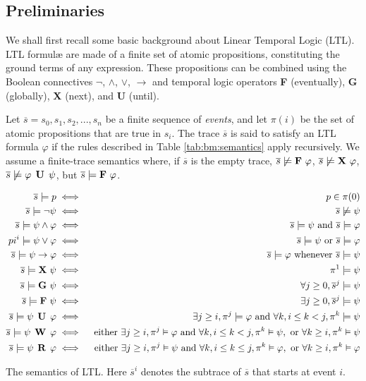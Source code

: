 \subsection{Preliminaries}

We shall first recall some basic background about Linear Temporal Logic (LTL). LTL formul\ae{} are made of a finite set of atomic propositions, constituting the ground terms of any expression. These propositions can be combined using the Boolean connectives $\neg$, $\wedge$, $\vee$, $\rightarrow$ and temporal logic operators \textbf{F} (eventually), \textbf{G} (globally), \textbf{X} (next), and \textbf{U} (until).

Let $\overline{s} = s_0, s_1, s_2, ..., s_n$ be a finite sequence of \emph{events}, and let $\pi(i)$ be the set of atomic propositions that are true in $s_i$. The trace $\overline{s}$ is said to satisfy an LTL formula $\varphi$ if the rules described in Table \ref{tab:bm:semantics} apply recursively. We assume a finite-trace semantics where, if $\overline{s}$ is the empty trace,  $\overline{s} \not\models \mathop{\mbox{\textbf{F}}}\, \varphi$, $\overline{s} \not\models \mathop{\mbox{\textbf{X}}}\, \varphi$, $\overline{s} \not\models \varphi \mathrel{\mbox{\,\textbf{U}}}\, \psi$, but $\overline{s} \models \mathop{\mbox{\textbf{F}}}\, \varphi$.

\begin{table}
\begin{eqnarray*}
\overline{s} \models p & \iff &  p \in \pi(0)\\
\overline{s} \models \neg\psi & \iff &  \overline{s} \not\models \psi\\
\overline{s} \models \psi \wedge \varphi & \iff &  \overline{s} \models \psi \mbox{ and }\overline{s} \models \varphi\\
pi^i \models \psi \vee \varphi & \iff &  \overline{s} \models \psi\mbox{ or }\overline{s} \models \varphi\\
\overline{s} \models \psi \rightarrow \varphi & \iff &  \overline{s} \models \varphi \mbox{ whenever }\overline{s} \models \psi\\
\overline{s} \models \mathop{\mbox{\textbf{X}}}\,\psi & \iff &  \pi^{1} \models \psi\\
\overline{s} \models \mathop{\mbox{\textbf{G}}}\,\psi & \iff &  \forall j \geq 0, \overline{s}^j \models \psi\\
\overline{s} \models \mathop{\mbox{\textbf{F}}}\,\psi & \iff &  \exists j \geq 0, \overline{s}^j \models \psi\\
\overline{s} \models \psi \mathrel{\mbox{\,\textbf{U}}}\, \varphi & \iff &  \exists j \geq i, \pi^j \models \varphi \mbox{ and }\forall k, i \leq k < j, \pi^k \models \psi\\
\overline{s} \models \psi \mathrel{\mbox{\,\textbf{W}}}\, \varphi & \iff & \mbox{ either } \exists j \geq i, \pi^j \vDash \varphi \mbox{ and } \forall k, i \leq k < j, \pi^k \vDash \psi, \mbox{ or } \forall k \geq i, \pi^k \vDash \psi \\
\overline{s} \models \psi \mathrel{\mbox{\,\textbf{R}}}\, \varphi & \iff & \mbox{ either } \exists j \geq i, \pi^j \vDash \psi \mbox{ and } \forall k, i \leq k \leq j, \pi^k \vDash \varphi, \mbox{ or } \forall k \geq i, \pi^k \vDash \varphi
\\
\end{eqnarray*}
\caption{The semantics of LTL. Here $\overline{s}^i$ denotes the subtrace of $\overline{s}$ that starts at event $i$.}
\label{tab:bm:semantics}
\end{table}

